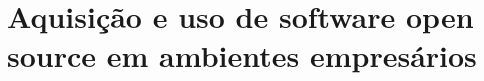 \section{Aquisição e uso de software open source em ambientes empresários} \label{section: aquisição}
\lipsum[1-8]